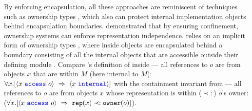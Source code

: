 






By enforcing encapsulation, %
all these approaches are reminiscent of techniques such as
ownership types \cite{ownalias,NobPotVitECOOP98},
which also can 
protect internal implementation objects behind 
encapsulation boundaries.  \cite{Banerjee:2005,encaps} demonstrated that by
ensuring confinement, ownership
systems can enforce representation independence.
\Nec relies on an implicit form of ownership types \cite{confined},
where inside objects are encapsulated behind a boundary 
consisting of all the internal objects that are accessible outside their
defining module \cite{TAME2003}.  
Compare 
\Nec's definition of %
inside
--- all references to $o$ are from objects $x$
that are within $M$ (here internal to $M$):
$\all{x}{\access{x}{o}\ \Rightarrow\ \internal{x}}$
with the containment invariant 
from  ---
all references to $o$ are from objects $x$
whose representation is within ($\prec:$) $o$'s owner:
($\all{x}{\access{x}{o}\ \Rightarrow\ \texttt{rep}(x) \prec:
  \texttt{owner}(o)  }$).

